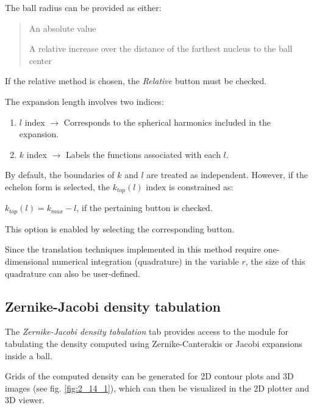 \documentclass[10pt]{article}
\begin{document}
\begin{itemize}
\item The ball radius can be provided as either:
\vspace*{-5mm}
\begin{quote}
\item An absolute value
\item A relative increase over the distance of the farthest nucleus to the ball center
\end{quote}

\item If the relative method is chosen, the {\it Relative} button must be checked.
\end{itemize}

The expansion length involves two indices:

\begin{enumerate}
\item $l$ index $\rightarrow$ Corresponds to the spherical harmonics included in the expansion.
\item $k$ index $\rightarrow$ Labels the functions associated with each $l$.
\end{enumerate}

By default, the boundaries of $k$ and $l$ are treated as independent.
However, if the echelon form is selected, the $k_{top}(l)$ index is constrained as:

$k_{top}(l) = k_{max} - l$, if the pertaining button is checked.

This option is enabled by selecting the corresponding button.

Since the translation techniques implemented in this method
require one-dimensional numerical integration (quadrature) in the variable $r$,
the size of this quadrature can also be user-defined.


\subsection{Zernike-Jacobi density tabulation\label{sec:2.14}}

The {\it Zernike-Jacobi density tabulation} tab provides access to the module
for tabulating the density computed using Zernike-Canterakis or Jacobi expansions inside a ball.

Grids of the computed density can be generated for 2D contour plots
and 3D images (see fig. \ref{fig:2_14_1}),
which can then be visualized in the 2D plotter and 3D viewer.
\end{document}
